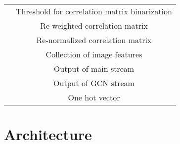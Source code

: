 \documentclass[10pt,twocolumn,letterpaper]{article}
\begin{document}
\begin{table}[H]
\begin{adjustbox}{width=0.45\textwidth}
\begin{tabular}{cc}
         & Threshold for correlation matrix binarization \\
         & Re-weighted correlation matrix \\
         & Re-normalized correlation matrix \\
         & Collection of image features \\
         & Output of main stream \\
         & Output of GCN stream \\
         & One hot vector \\
        \bottomrule
    \end{tabular}
    \end{adjustbox}
    \label{tab:notation}
\end{table}

\section{Architecture}
\end{document}
